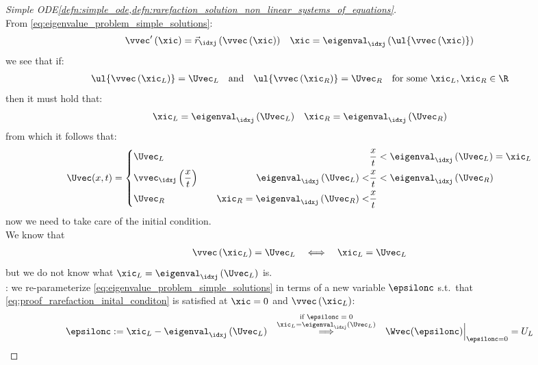 \begin{proofbox}\nospacing
    \begin{proof}[Simple ODE\cref{defn:simple_ode,defn:rarefaction_solution_non_linear_systems_of_equations}]\label{proof:defn:simple_ode}\leavevmode\\
        From \cref{eq:eigenvalue_problem_simple_solutions}:
        \begin{align}
                \vvec'\left(\xic\right)=\vec{r}_{\idxj}\left(\vvec\left(\xic\right)\right)&&\xic=\eigenval_{\idxj}\left(\ul{\vvec\left(\xic\right)}\right)
                                                                                             \label{eq:proof:defn:simple_ode_eigenvalues}
        \end{align}
        we see that if:
        \begin{align*}
            \ul{\vvec \left(\xic_{L}\right)}=\Uvec_{L}&&\text{and}&&\ul{\vvec \left(\xic_{R}\right)}=\Uvec_{R}&&\text{for some }\xic_{L},\xic_{R}\in\R
        \end{align*}
        then it must hold that:
        \begin{align*}
         \xic_{L}=\eigenval_{\idxj}\left(\Uvec_{L}\right) &&\xic_{R}=\eigenval_{\idxj}\left(\Uvec_{R}\right)
        \end{align*}
        from which it follows that:
        \begin{align}
          \Uvec(x,t)=
          \left\{\begin{alignedat}{5}
              &\Uvec_{L}&&&&\frac{x}{t}<\eigenval_{\idxj}\left(\Uvec_{L}\right)=\xic_{L} \\
              &\vvec_{\idxj}\left(\frac{x}{t}\right)&&\qquad&\eigenval_{\idxj}\left(\Uvec_{L}\right)<&\frac{x}{t}<\eigenval_{\idxj}\left(\Uvec_{R}\right) \\
              &\Uvec_{R}&&&\xic_{R}=\eigenval_{\idxj}\left(\Uvec_{R}\right)<&\frac{x}{t}
          \end{alignedat}\right.\label{eq:simple_solution_unshifted}
        \end{align}
        now we need to take care of the initial condition.\\ We know that
        \begin{align}
          \vvec \left(\xic_{L}\right)=\Uvec_{L}&&\iff&&\xic_{L}=\Uvec_{L}\label{eq:proof_rarefaction_inital_conditon}
        \end{align} but we do not know what $\xic_{L}=\eigenval_{\idxj}\left(\Uvec_{L}\right)$ is.\\
        : we re-parameterize \cref{eq:eigenvalue_problem_simple_solutions} in terms of a new variable $\epsilonc$ s.t.\ that \cref{eq:proof_rarefaction_inital_conditon}
        is satisfied at $\xic=0$ and $\vvec \left(\xic_{L}\right)$:
        \begin{align*}
          \epsilonc:=\xic_{L}-\eigenval_{\idxj}\left(\Uvec_{L}\right)&&\stackrel{\substack{\text{if $\epsilonc=0$}\\ \xic_{L}=\eigenval_{\idxj}\left(\Uvec_{L}\right)}}{\implies}&&\Wvec(\epsilonc)\Big|_{\epsilonc=0}=U_{L}
        \end{align*}
    \end{proof}
\end{proofbox}
